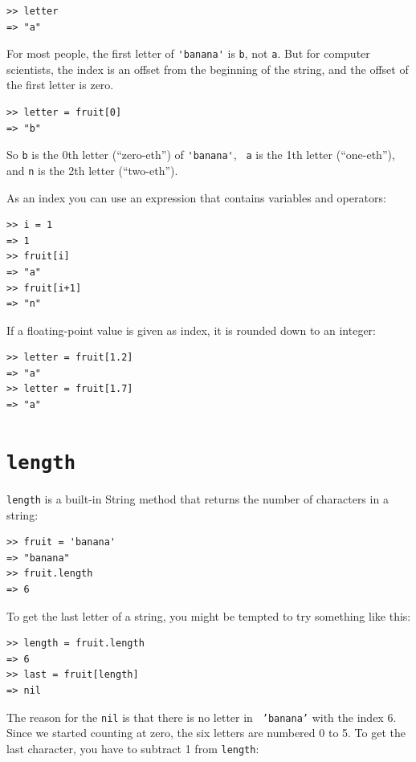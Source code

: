 \documentclass[10pt]{book}
\begin{document}
\begin{verbatim}
>> letter
=> "a"
\end{verbatim}
%
For most people, the first letter of \verb"'banana'" is {\tt b}, not
{\tt a}.  But for computer scientists, the index is an offset from the
beginning of the string, and the offset of the first letter is zero.

\begin{verbatim}
>> letter = fruit[0]
=> "b"
\end{verbatim}
%
So {\tt b} is the 0th letter (``zero-eth'') of \verb"'banana'", {\tt
  a} is the 1th letter (``one-eth''), and {\tt n} is the 2th letter
(``two-eth'').

As an index you can use an expression that contains variables and
operators:

\begin{verbatim}
>> i = 1
=> 1
>> fruit[i]
=> "a"
>> fruit[i+1]
=> "n"
\end{verbatim}
%

If a floating-point value is given as index, it is rounded
down to an integer:

\begin{verbatim}
>> letter = fruit[1.2]
=> "a"
>> letter = fruit[1.7]
=> "a"
\end{verbatim}
%

\section{{\tt length}}

{\tt length} is a built-in String method that returns the number of characters
in a string:

\begin{verbatim}
>> fruit = 'banana'
=> "banana"
>> fruit.length
=> 6
\end{verbatim}
%
To get the last letter of a string, you might be tempted to try something
like this:

\begin{verbatim}
>> length = fruit.length
=> 6
>> last = fruit[length]
=> nil
\end{verbatim}
%
The reason for the {\tt nil} is that there is no letter in {\tt
'banana'} with the index 6.  Since we started counting at zero, the
six letters are numbered 0 to 5.  To get the last character, you have
to subtract 1 from {\tt length}:
\end{document}
